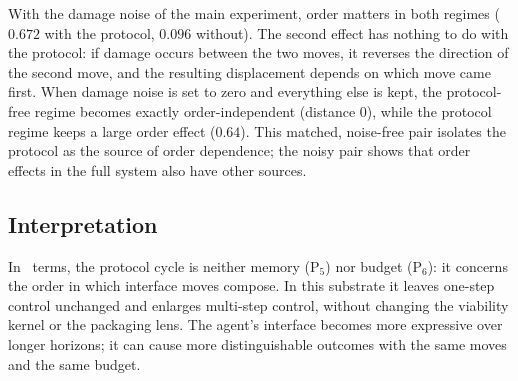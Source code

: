 \begin{table}[t]
\centering
\small

\caption{Total variation distance between the outside-position distributions produced by RIGHT-then-LEFT and LEFT-then-RIGHT from $s^\star=(y=0,u=0,\phi=1,r=2)$. Exact values: $84/125$ and $12/125$ with damage noise, $16/25$ and $0$ without it. The slip probability is $0.2$ in all four cases.}
\label{tab:holonomy_witness}
\end{table}

With the damage noise of the main experiment, order matters in both regimes ($0.672$ with the protocol, $0.096$ without). The second effect has nothing to do with the protocol: if damage occurs between the two moves, it reverses the direction of the second move, and the resulting displacement depends on which move came first. When damage noise is set to zero and everything else is kept, the protocol-free regime becomes exactly order-independent (distance $0$), while the protocol regime keeps a large order effect ($0.64$). This matched, noise-free pair isolates the protocol as the source of order dependence; the noisy pair shows that order effects in the full system also have other sources.

\subsection{Interpretation}
In \SBT\ terms, the protocol cycle is neither memory (P$_5$) nor budget (P$_6$): it concerns the order in which interface moves compose. In this substrate it leaves one-step control unchanged and enlarges multi-step control, without changing the viability kernel or the packaging lens. The agent's interface becomes more expressive over longer horizons; it can cause more distinguishable outcomes with the same moves and the same budget.
